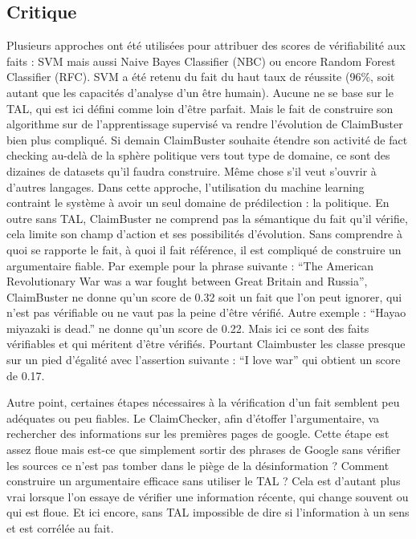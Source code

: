 \subsection{Critique}

Plusieurs approches ont été utilisées pour attribuer des scores de vérifiabilité aux faits : SVM mais aussi Naive Bayes Classifier (NBC) ou encore Random Forest Classifier (RFC). SVM a été retenu du fait du haut taux de réussite (96\%, soit autant que les capacités d'analyse d'un être humain). Aucune ne se base sur le TAL, qui est ici défini comme loin d'être parfait. Mais le fait de construire son algorithme sur de l'apprentissage supervisé va rendre l'évolution de ClaimBuster bien plus compliqué. Si demain ClaimBuster souhaite étendre son activité de fact checking au-delà de la sphère politique vers tout type de domaine, ce sont des dizaines de datasets qu'il faudra construire. Même chose s'il veut s'ouvrir à d'autres langages. Dans cette approche, l'utilisation du machine learning contraint le système à avoir un seul domaine de prédilection : la politique. En outre sans TAL, ClaimBuster ne comprend pas la sémantique du fait qu'il vérifie, cela limite son champ d'action et ses possibilités d'évolution. Sans comprendre à quoi se rapporte le fait, à quoi il fait référence, il est compliqué de construire un argumentaire fiable. Par exemple pour la phrase suivante : \enquote{The American Revolutionary War was a war fought between Great Britain and Russia}, ClaimBuster ne donne qu'un score de 0.32 soit un fait que l'on peut ignorer, qui n'est pas vérifiable ou ne vaut pas la peine d'être vérifié. Autre exemple : \enquote{Hayao miyazaki is dead.} ne donne qu'un score de 0.22. Mais ici ce sont des faits vérifiables et qui méritent d'être vérifiés. Pourtant Claimbuster les classe presque sur un pied d'égalité avec l'assertion suivante : \enquote{I love war} qui obtient un score de 0.17. 

Autre point, certaines étapes nécessaires à la vérification d'un fait semblent peu adéquates ou peu fiables. Le ClaimChecker, afin d'étoffer l'argumentaire, va rechercher des informations sur les premières pages de google. Cette étape est assez floue mais est-ce que simplement sortir des phrases de Google sans vérifier les sources ce n'est pas tomber dans le piège de la désinformation ? Comment construire un argumentaire efficace sans utiliser le TAL ? Cela est d'autant plus vrai lorsque l'on essaye de vérifier une information récente, qui change souvent ou qui est floue. Et ici encore, sans TAL impossible de dire si l'information à un sens et est corrélée au fait.

